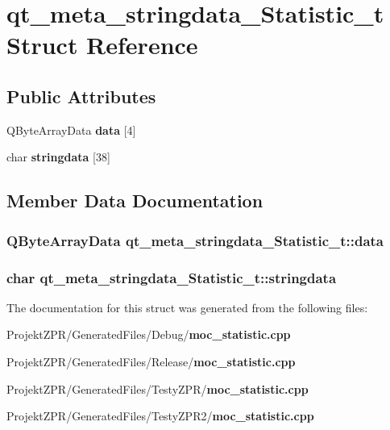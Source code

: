 \section{qt\-\_\-meta\-\_\-stringdata\-\_\-\-Statistic\-\_\-t Struct Reference}
\label{structqt__meta__stringdata___statistic__t}
\subsection*{Public Attributes}
\begin{DoxyCompactItemize}
\item 
Q\-Byte\-Array\-Data {\bf data} [4]
\item 
char {\bf stringdata} [38]
\end{DoxyCompactItemize}


\subsection{Member Data Documentation}
\subsubsection[{data}]{\setlength{\rightskip}{0pt plus 5cm}Q\-Byte\-Array\-Data qt\-\_\-meta\-\_\-stringdata\-\_\-\-Statistic\-\_\-t\-::data}\label{structqt__meta__stringdata___statistic__t_aacc35c824e5433c6ea03fe785f20801a}
\subsubsection[{stringdata}]{\setlength{\rightskip}{0pt plus 5cm}char qt\-\_\-meta\-\_\-stringdata\-\_\-\-Statistic\-\_\-t\-::stringdata}\label{structqt__meta__stringdata___statistic__t_a91da8553731bcc28473f5274043a107c}


The documentation for this struct was generated from the following files\-:\begin{DoxyCompactItemize}
\item 
Projekt\-Z\-P\-R/\-Generated\-Files/\-Debug/{\bf moc\-\_\-statistic.\-cpp}\item 
Projekt\-Z\-P\-R/\-Generated\-Files/\-Release/{\bf moc\-\_\-statistic.\-cpp}\item 
Projekt\-Z\-P\-R/\-Generated\-Files/\-Testy\-Z\-P\-R/{\bf moc\-\_\-statistic.\-cpp}\item 
Projekt\-Z\-P\-R/\-Generated\-Files/\-Testy\-Z\-P\-R2/{\bf moc\-\_\-statistic.\-cpp}\end{DoxyCompactItemize}
